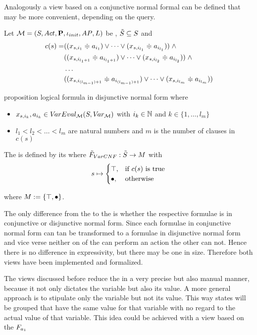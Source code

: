 \documentclass[preview]{standalone}
\begin{document}
Analogously a view based on a conjunctive normal formal can be defined that may be more convenient, depending on the query.

\begin{definition}
	Let $\chgph = \chgphtuple$ be \achgphN, $\smstates \subseteq \states$ and 
	\begin{align*}
		c(s) = &((\varstate[,i_1] \eqorneq \varval_{i_1}) \lor \dots \lor (\varstate[,i_{l_1}] \eqorneq \varval_{i_{l_1}})) \; \land \\
		&((\varstate[,i_{l_1+1}] \eqorneq \varval_{i_{l_1+1}}) \lor \dots \lor (\varstate[,i_{l_2}] \eqorneq \varval_{i_{l_2}})) \; \land  \\
		&\dots \\ 
		&((\varstate[,i_{(l_{m-1})+1}] \eqorneq \varval_{i_{(l_{m-1})+1}}) \lor \dots \lor (\varstate[,i_{l_m}]  \eqorneq \varval_{i_{l_m}}))
	\end{align*}
	
	proposition logical formula in disjunctive normal form where
	\begin{itemize}
			\item $\varstate[,i_k], a_{i_k} \in \varevalimg$ with $i_k\in \natnums$ and $k \in \{1, \dots, l_m\}$
			\item $l_1 < l_2 < \dots < l_m$ are natural numbers and $m$ is the number of clauses in $c(s)$
	\end{itemize}
	The \viewN \viewparamcnf is defined by its \grpfctN where $\gfctsubparamcnf : \smstates \to \imggrp$ with
	\[
	\state \mapsto
	\begin{cases}
			\group, &\text{if } c(s) \text{ is true}\\
			\remelem, 	&\text{otherwise}
		\end{cases}
	\]
	
	where $\imggrp := \{\group, \remelem\}$.
\end{definition}

The only difference from the \viewN \viewparamcnf to the \viewN \viewparamdnf is whether the respective formulae is in conjunctive or disjunctive normal form. Since each formulae in conjunctive normal form can tan be transformed to a formulae in disjunctive normal form and vice verse neither on of the \viewsN can perform an action the other can not. Hence there is no difference in expressivity, but there may be one in size. Therefore both views have been implemented and formalized. 

The views discussed before reduce the \chgphN in a very precise but also manual manner, because it not only dictates the variable but also its value. A more general approach is to stipulate only the variable but not its value. This way states will be grouped that have the same value for that variable with no regard to the actual value of that variable. This idea could be achieved with a view based on the \grpfctN $\grpfct[\varval_1 ]$%
\end{document}
